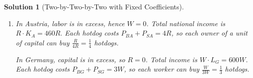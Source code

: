 \documentclass[a4paper,12pt]{article} %
\theoremstyle{nonitalic}
\newtheorem{solution}{Solution}
\begin{document}
\begin{solution}[Two-by-Two-by-Two with Fixed Coefficients]
\begin{enumerate}
\begin{enumerate}
                \item[(b)] In Austria, labor is in excess, hence $W=0$.  Total national income is $R\cdot K_A = 460R.$
                Each hotdog costs $P_{BA} + P_{SA} = 4R$, so each owner of a unit of capital can buy $\frac{R}{4R} = \frac{1}{4}$ hotdogs.
                
                In Germany, capital is in excess, so $R = 0$. Total income is $W \cdot L_G = 600W$.
                Each hotdog costs $P_{BG} + P_{SG} = 3W$, so each worker can buy $\frac{W}{3W} = \frac{1}{3}$ hotdogs.
            \end{enumerate} 
    \end{enumerate}
\end{solution}
\end{document}
